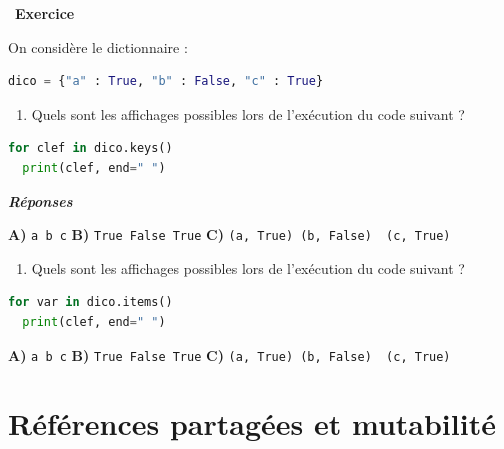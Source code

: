 \documentclass[
  11pt,
]{article}
\newcommand{\passthrough}[1]{#1}
\providecommand{\tightlist}{%
  \setlength{\itemsep}{0pt}\setlength{\parskip}{0pt}}
\newcounter{exo}
\newenvironment{exercice}[1]
{\par \medskip   \addtocounter{exo}{1} \noindent  
\begin{bclogo}[arrondi =0.1,   noborder = true, logo=\bccrayon, marge=4]{~\textbf{Exercice} \textbf{\theexo} {\itshape #1} }  \par}
{
\end{bclogo}
 \par \bigskip }
\newcounter{def}
\begin{document}
\begin{exercice}{}

On considère le dictionnaire :

\begin{lstlisting}[language=Python]
dico = {"a" : True, "b" : False, "c" : True}
\end{lstlisting}

\begin{enumerate}
\def\labelenumi{\arabic{enumi}.}
\tightlist
\item
  Quels sont les affichages possibles lors de l'exécution du code
  suivant ?
\end{enumerate}

\begin{lstlisting}[language=Python]
for clef in dico.keys()
  print(clef, end=" ")
\end{lstlisting}

\textbf{\emph{Réponses}}

\textbf{A)} \passthrough{\lstinline!a b c!} \textbf{B)}
\passthrough{\lstinline!True False True!} \textbf{C)}
\passthrough{\lstinline!(a, True) (b, False)  (c, True)!}

\begin{enumerate}
\def\labelenumi{\arabic{enumi}.}
\setcounter{enumi}{1}
\tightlist
\item
  Quels sont les affichages possibles lors de l'exécution du code
  suivant ?
\end{enumerate}

\begin{lstlisting}[language=Python]
for var in dico.items()
  print(clef, end=" ")
\end{lstlisting}

\textbf{A)} \passthrough{\lstinline!a b c!} \textbf{B)}
\passthrough{\lstinline!True False True!} \textbf{C)}
\passthrough{\lstinline!(a, True) (b, False)  (c, True)!}

\end{exercice}

\hypertarget{ruxe9fuxe9rences-partaguxe9es-et-mutabilituxe9}{%
\section{Références partagées et
mutabilité}\label{ruxe9fuxe9rences-partaguxe9es-et-mutabilituxe9}}
\end{document}
